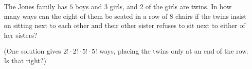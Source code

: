 The Jones family has $5$ boys and $3$ girls, and $2$ of the girls are twins. In how many ways can the eight of them be seated in a row of $8$ chairs if the twins insist on sitting next to each other and their other sister refuses to sit next to either of her sisters?

(One solution gives $2!\cdot2!\cdot5!\cdot5!$ ways, placing the twins only at an end of the row. Is that right?)
